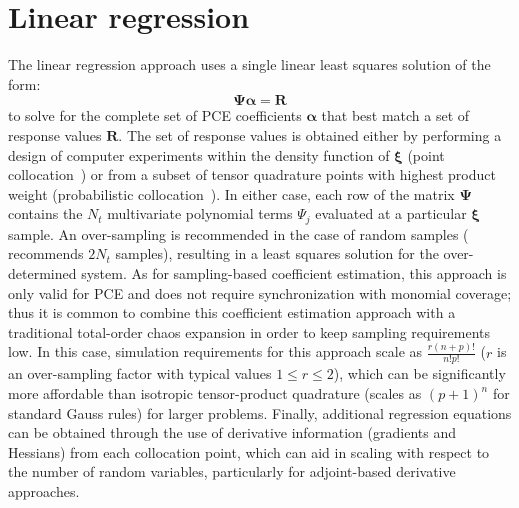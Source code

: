 \section{Linear regression} \label{uq:expansion:regress}

The linear regression approach uses a
single linear least squares solution of the form:
\begin{equation}
\boldsymbol{\Psi} \boldsymbol{\alpha} = \boldsymbol{R} \label{eq:regression}
\end{equation}
to solve for the complete set of PCE coefficients
$\boldsymbol{\alpha}$ that best match a set of response values
$\boldsymbol{R}$.  The set of response values is obtained either by
performing a design of computer experiments within the density
function of $\boldsymbol{\xi}$ (point
collocation~\cite{pt_colloc1,pt_colloc2}) or from a subset of tensor
quadrature points with highest product weight (probabilistic
collocation~\cite{Tat95}).  In either case, each row of the matrix
$\boldsymbol{\Psi}$ contains the $N_t$ multivariate polynomial terms
$\Psi_j$ evaluated at a particular $\boldsymbol{\xi}$ sample.  An
over-sampling is recommended in the case of random samples
(\cite{pt_colloc2} recommends $2N_t$ samples), resulting in a least
squares solution for the over-determined system.  As for
sampling-based coefficient estimation, this approach is only valid for
PCE and does not require synchronization with monomial coverage; thus
it is common to combine this coefficient estimation approach with a
traditional total-order chaos expansion in order to keep sampling
requirements low.  In this case, simulation requirements for this
approach scale as $\frac{r(n+p)!}{n!p!}$ ($r$ is an over-sampling
factor with typical values $1 \leq r \leq 2$), which can be
significantly more affordable than isotropic tensor-product quadrature
(scales as $(p+1)^n$ for standard Gauss rules) for larger problems.
Finally, additional regression equations can be obtained through the
use of derivative information (gradients and Hessians) from each
collocation point, which can aid in scaling with respect to the number
of random variables, particularly for adjoint-based derivative
approaches.


